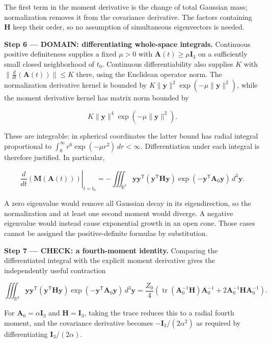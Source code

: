\documentclass[11pt,oneside,openany]{book}
\begin{document}
The first term in the moment derivative is the change of total Gaussian mass; normalization removes it from the covariance derivative. The factors containing \(\mathbf H\) keep their order, so no assumption of simultaneous eigenvectors is needed.

\begin{DomainStep}
\textbf{Step 6 --- DOMAIN: differentiating whole-space integrals.} Continuous positive definiteness supplies a fixed \(\mu>0\) with \(\mathbf A(t)\ge\mu\mathbf I_3\) on a sufficiently small closed neighborhood of \(t_0\). Continuous differentiability also supplies \(K\) with \(\|\frac{d}{dt}(\mathbf A(t))\|\le K\) there, using the Euclidean operator norm. The normalization derivative kernel is bounded by \(K\|\mathbf y\|^2\exp(-\mu\|\mathbf y\|^2)\), while the moment derivative kernel has matrix norm bounded by

\[
K\|\mathbf y\|^4\exp(-\mu\|\mathbf y\|^2).
\]

These are integrable: in spherical coordinates the latter bound has radial integral proportional to \(\int_0^\infty r^6\exp(-\mu r^2)\,dr<\infty\). Differentiation under each integral is therefore justified. In particular,

\[
\left.\frac{d}{dt}(\mathbf M(\mathbf A(t)))\right|_{t=t_0}
=-\iiint_{\mathbb R^3}\mathbf y\mathbf y^{\mathsf T}
(\mathbf y^{\mathsf T}\mathbf H\mathbf y)\exp(-\mathbf y^{\mathsf T}\mathbf A_0\mathbf y)\,d^3\mathbf y.
\]

A zero eigenvalue would remove all Gaussian decay in its eigendirection, so the normalization and at least one second moment would diverge. A negative eigenvalue would instead cause exponential growth in an open cone. Those cases cannot be assigned the positive-definite formulas by substitution.

\end{DomainStep}
\textbf{Step 7 --- CHECK: a fourth-moment identity.} Comparing the differentiated integral with the explicit moment derivative gives the independently useful contraction

\[
\iiint_{\mathbb R^3}\mathbf y\mathbf y^{\mathsf T}
(\mathbf y^{\mathsf T}\mathbf H\mathbf y)\exp(-\mathbf y^{\mathsf T}\mathbf A_0\mathbf y)\,d^3\mathbf y
=\frac{Z_0}{4}\left(
\operatorname{tr}(\mathbf A_0^{-1}\mathbf H)\mathbf A_0^{-1}
+2\mathbf A_0^{-1}\mathbf H\mathbf A_0^{-1}\right).
\]

For \(\mathbf A_0=\alpha\mathbf I_3\) and \(\mathbf H=\mathbf I_3\), taking the trace reduces this to a radial fourth moment, and the covariance derivative becomes \(-\mathbf I_3/(2\alpha^2)\) as required by differentiating \(\mathbf I_3/(2\alpha)\).
\end{document}
